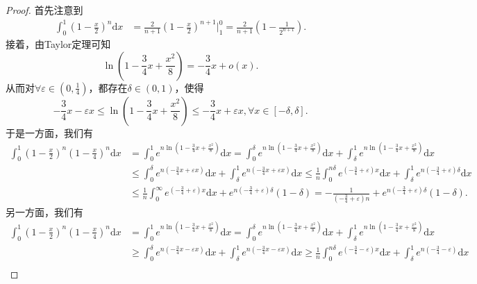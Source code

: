 \documentclass[../../main.tex]{subfiles}
\begin{document}
\begin{proof}
首先注意到
\begin{align}
\int_0^1{\left( 1-\frac{x}{2} \right) ^n\mathrm{d}x}&=\frac{2}{n+1}\left( 1-\frac{x}{2} \right) ^{n+1}\Big|_{1}^{0}=\frac{2}{n+1}\left( 1-\frac{1}{2^{n+1}} \right) .\label{example-Laplace0.7-0.0}
\end{align}
接着，由Taylor定理可知
\[
\ln \left( 1-\frac{3}{4}x+\frac{x^2}{8} \right) =-\frac{3}{4}x+o\left( x \right) .
\]
从而对$\forall \varepsilon \in \left( 0,\frac{1}{4} \right)$，都存在$\delta \in \left( 0,1 \right)$，使得
\[
-\frac{3}{4}x-\varepsilon x\leqslant \ln \left( 1-\frac{3}{4}x+\frac{x^2}{8} \right) \leqslant -\frac{3}{4}x+\varepsilon x,\forall x\in \left[ -\delta ,\delta \right] .
\]
于是一方面，我们有
\begin{align*}
\int_0^1{\left( 1-\frac{x}{2} \right) ^n\left( 1-\frac{x}{4} \right) ^n\mathrm{d}x}&=\int_0^1{e^{n\ln \left( 1-\frac{3}{4}x+\frac{x^2}{8} \right)}\mathrm{d}x}=\int_0^{\delta}{e^{n\ln \left( 1-\frac{3}{4}x+\frac{x^2}{8} \right)}\mathrm{d}x}+\int_{\delta}^1{e^{n\ln \left( 1-\frac{3}{4}x+\frac{x^2}{8} \right)}\mathrm{d}x}\\
&\leqslant \int_0^{\delta}{e^{n\left( -\frac{3}{4}x+\varepsilon x \right)}\mathrm{d}x}+\int_{\delta}^1{e^{n\left( -\frac{3}{4}x+\varepsilon x \right)}\mathrm{d}x}\leqslant \frac{1}{n}\int_0^{n\delta}{e^{\left( -\frac{3}{4}+\varepsilon \right) x}\mathrm{d}x}+\int_{\delta}^1{e^{n\left( -\frac{3}{4}+\varepsilon \right) \delta}\mathrm{d}x}\\
&\leqslant \frac{1}{n}\int_0^{\infty}{e^{\left( -\frac{3}{4}+\varepsilon \right) x}\mathrm{d}x}+e^{n\left( -\frac{3}{4}+\varepsilon \right) \delta}\left( 1-\delta \right) =-\frac{1}{\left( -\frac{3}{4}+\varepsilon \right) n}+e^{n\left( -\frac{3}{4}+\varepsilon \right) \delta}\left( 1-\delta \right) .
\end{align*}
另一方面，我们有
\begin{align*}
\int_0^1{\left( 1-\frac{x}{2} \right) ^n\left( 1-\frac{x}{4} \right) ^n\mathrm{d}x}&=\int_0^1{e^{n\ln \left( 1-\frac{3}{4}x+\frac{x^2}{8} \right)}\mathrm{d}x}=\int_0^{\delta}{e^{n\ln \left( 1-\frac{3}{4}x+\frac{x^2}{8} \right)}\mathrm{d}x}+\int_{\delta}^1{e^{n\ln \left( 1-\frac{3}{4}x+\frac{x^2}{8} \right)}\mathrm{d}x}\\
&\geqslant \int_0^{\delta}{e^{n\left( -\frac{3}{4}x-\varepsilon x \right)}\mathrm{d}x}+\int_{\delta}^1{e^{n\left( -\frac{3}{4}x-\varepsilon x \right)}\mathrm{d}x}\geqslant \frac{1}{n}\int_0^{n\delta}{e^{\left( -\frac{3}{4}-\varepsilon \right) x}\mathrm{d}x}+\int_{\delta}^1{e^{n\left( -\frac{3}{4}-\varepsilon \right)}\mathrm{d}x}\\

\end{align*}
\end{proof}
\end{document}
